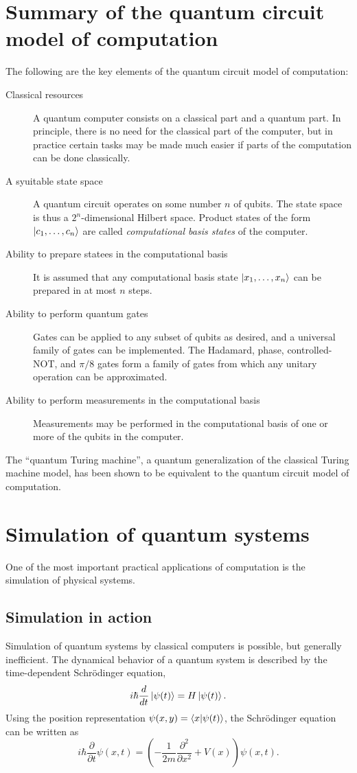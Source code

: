 \section{Summary of the quantum circuit model of computation}
The following are the key elements of the quantum circuit model of computation:
\begin{description}
    \item[Classical resources] A quantum computer consists on a classical part and a quantum part.
        In principle, there is no need for the classical part of the computer,
        but in practice certain tasks may be made much easier if parts of the computation can be done classically.
    \item[A syuitable state space] A quantum circuit operates on some number $n$ of qubits.
        The state space is thus a $2^n$-dimensional Hilbert space.
        Product states of the form $\ket{c_1, \ldots, c_n}$ are called \emph{computational basis states} of the computer.
    \item[Ability to prepare statees in the computational basis] It is assumed that any computational basis state $\ket{x_1, \ldots, x_n}$ can be prepared in at most $n$ steps.
    \item[Ability to perform quantum gates] Gates can be applied to any subset of qubits as desired,
        and a universal family of gates can be implemented.
        The Hadamard, phase, controlled-NOT, and $\pi/8$ gates form a family of gates from which any unitary operation can be approximated.
    \item[Ability to perform measurements in the computational basis] Measurements may be performed in the computational basis of one or more of the qubits in the computer.
\end{description}

The ``quantum Turing machine'',
a quantum generalization of the classical Turing machine model,
has been shown to be equivalent to the quantum circuit model of computation.

\section{Simulation of quantum systems}
One of the most important practical applications of computation is the simulation of physical systems.

\subsection{Simulation in action}
Simulation of quantum systems by classical computers is possible, but generally inefficient.
The dynamical behavior of a quantum system is described by the time-dependent Schrödinger equation,
\[
    i\hbar \frac{d}{dt}\ket{\psi(t)} = H\ket{\psi(t)}.
\]
Using the position representation $\psi(x, y) = \braket{x| \psi(t)}$, the Schrödinger equation can be written as
\[
    i\hbar \frac{\partial}{\partial t}\psi(x, t) = \left(-\frac{1}{2m}\frac{\partial^2}{\partial x^2} + V(x)\right)\psi(x, t).
\]

